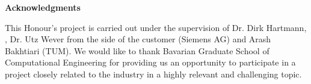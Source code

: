 \clearemptydoublepage
{}
{}	



\vspace*{2cm}

\begin{center}
{\Large \bf Acknowledgments}
\end{center}

\vspace{1cm}

This Honour's project is carried out under the supervision of Dr. Dirk Hartmann, , Dr. Utz Wever  from the side of the customer (Siemens AG) and Arash Bakhtiari (TUM). We would like to thank Bavarian Graduate School of Computational Engineering for providing us an opportunity to participate in a project closely related to the industry in a highly relevant and challenging topic.
